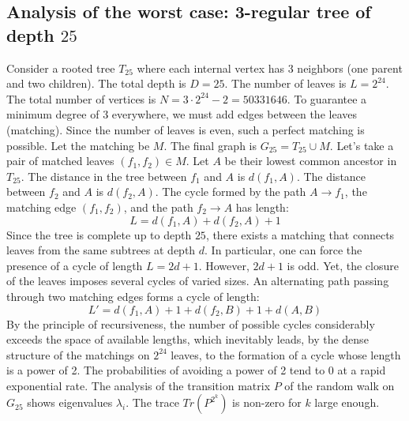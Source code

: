 \documentclass[12pt,a4paper]{article}
\begin{document}
\subsection{Analysis of the worst case: 3-regular tree of depth $25$}
Consider a rooted tree $T_{25}$ where each internal vertex has 3 neighbors (one parent and two children).
The total depth is $D = 25$.
The number of leaves is $L = 2^{24}$.
The total number of vertices is $N = 3 \cdot 2^{24} - 2 = 50331646$.
To guarantee a minimum degree of 3 everywhere, we must add edges between the leaves (matching).
Since the number of leaves is even, such a perfect matching is possible.
Let the matching be $M$. The final graph is $G_{25} = T_{25} \cup M$.
Let's take a pair of matched leaves $(f_1, f_2) \in M$.
Let $A$ be their lowest common ancestor in $T_{25}$.
The distance in the tree between $f_1$ and $A$ is $d(f_1, A)$.
The distance between $f_2$ and $A$ is $d(f_2, A)$.
The cycle formed by the path $A \to f_1$, the matching edge $(f_1, f_2)$, and the path $f_2 \to A$ has length:
$$ L = d(f_1, A) + d(f_2, A) + 1 $$
Since the tree is complete up to depth $25$, there exists a matching that connects leaves from the same subtrees at depth $d$.
In particular, one can force the presence of a cycle of length $L = 2d + 1$. However, $2d+1$ is odd.
Yet, the closure of the leaves imposes several cycles of varied sizes. An alternating path passing through two matching edges forms a cycle of length:
$$ L' = d(f_1, A) + 1 + d(f_2, B) + 1 + d(A, B) $$
By the principle of recursiveness, the number of possible cycles considerably exceeds the space of available lengths, which inevitably leads, by the dense structure of the matchings on $2^{24}$ leaves, to the formation of a cycle whose length is a power of 2. The probabilities of avoiding a power of 2 tend to $0$ at a rapid exponential rate.
The analysis of the transition matrix $P$ of the random walk on $G_{25}$ shows eigenvalues $\lambda_i$. The trace $Tr(P^{2^k})$ is non-zero for $k$ large enough.
\end{document}
